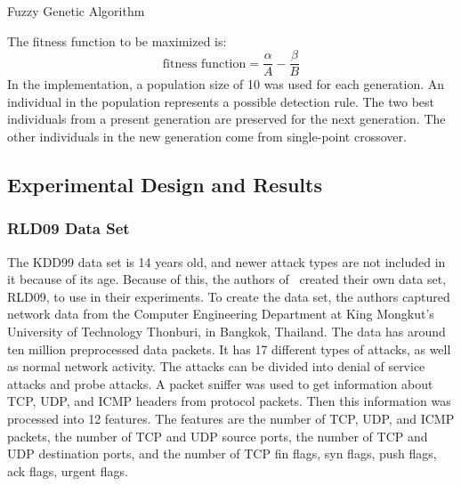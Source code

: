 \documentclass{sig-alternate}
\begin{document}
\begin{algorithm}
\caption{Fuzzy Genetic Algorithm}
\label{alg:fuzGenAlg}
\begin{algorithmic}

    \ENDFOR
    
      \ELSE {}
    \ENDIF
  \ENDFOR
  
\ENDFOR
{}
\end{algorithmic}
\end{algorithm}


The fitness function to be maximized is:
\begin{equation*}
\textrm{fitness function} = \frac{\alpha}{A} - \frac{\beta}{B}
\end{equation*}
In the implementation, a population size of 10 was used for each generation. An individual in the population represents a possible detection rule. The two best individuals from a present generation are preserved for the next generation. The other individuals in the new generation come from single-point crossover.




\subsection{Experimental Design and Results}

\subsubsection{RLD09 Data Set}
The KDD99 data set is 14 years old, and newer attack types are not included in it because of its age. Because of this, the authors of~\cite{6496342, 6559603} created their own data set, RLD09, to use in their experiments. To create the data set, the authors captured network data from the Computer Engineering Department at King Mongkut's University of Technology Thonburi, in Bangkok, Thailand. The data has around ten million preprocessed data packets. It has 17 different types of attacks, as well as normal network activity. The attacks can be divided into denial of service attacks and probe attacks. A packet sniffer was used to get information about TCP, UDP, and ICMP headers from protocol packets. Then this information was processed into 12 features. The features are the number of TCP, UDP, and ICMP packets, the number of TCP and UDP source ports, the number of TCP and UDP destination ports, and the number of TCP fin flags, syn flags, push flags, ack flags, urgent flags.
\end{document}
